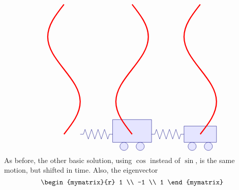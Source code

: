 \begin{solution}
\begin{itemize}
\begin{equation*}
\begin{tikzpicture}[scale=0.8, color=blue!50!black]
\begin{scope}[yshift=-8cm]
\begin{scope}[xshift=4.2cm]
            \draw[fill=blue!10] (1.8,0.5) rectangle (4.2,1.9);
            \draw[fill=blue!10] (2.5,0.25) circle (0.25);
            \draw[fill=blue!10] (3.5,0.25) circle (0.25);
          \end{scope}
          \begin{scope}[xshift=8.4cm]
            \draw[fill=blue!10] (2,0.5) rectangle (4,1.5);
            \draw[fill=blue!10] (2.5,0.25) circle (0.25);
            \draw[fill=blue!10] (3.5,0.25) circle (0.25);
          \end{scope}
          \begin{scope}[xshift=4cm]
            \draw (0,1) -- ++(0.2,0) -- ++(0.1,0.3)
            -- ++(0.2,-0.6) -- ++(0.2,0.6)
            -- ++(0.2,-0.6) -- ++(0.2,0.6)
            -- ++(0.2,-0.6) -- ++(0.2,0.6)
            -- ++(0.2,-0.6) -- ++(0.1,0.3)
            -- ++(0.2,0);
          \end{scope}
          \begin{scope}[xshift=8.4cm]
            \draw (0,1) -- ++(0.2,0) -- ++(0.1,0.3)
            -- ++(0.2,-0.6) -- ++(0.2,0.6)
            -- ++(0.2,-0.6) -- ++(0.2,0.6)
            -- ++(0.2,-0.6) -- ++(0.2,0.6)
            -- ++(0.2,-0.6) -- ++(0.1,0.3)
            -- ++(0.2,0);
          \end{scope}
        \end{scope}
        \begin{scope}[xshift=3cm,yshift=1cm,rotate=-90]
          \draw[ultra thick,red] (0,0) sin (2,-1) cos (4,0) sin (6,1) cos (8,0);
        \end{scope}
        \begin{scope}[xshift=7.2cm,yshift=1cm,rotate=-90]
          \draw[ultra thick,red] (0,0) sin (2,1) cos (4,0) sin (6,-1) cos (8,0);
        \end{scope}
        \begin{scope}[xshift=11.4cm,yshift=1cm,rotate=-90]
          \draw[ultra thick,red] (0,0) sin (2,-1) cos (4,0) sin (6,1) cos (8,0);
        \end{scope}
      \end{tikzpicture}
    \end{equation*}
    As before, the other basic solution, using $\cos$ instead of
    $\sin$, is the same motion, but shifted in time. Also, the
    eigenvector
    \begin{equation*}
      \begin{mymatrix}{r} 1 \\ -1 \\ 1 \end{mymatrix}

\end{equation*}
\end{itemize}
\end{solution}
